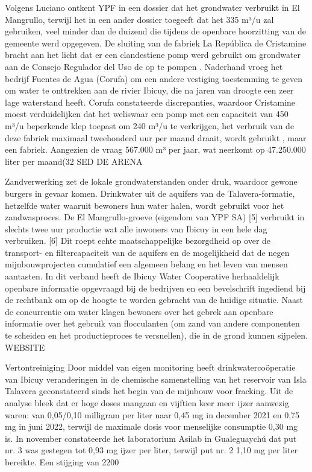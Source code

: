Volgens Luciano ontkent YPF in een dossier dat het grondwater verbruikt in El Mangrullo, terwijl het in een ander dossier toegeeft dat het 335 m³/u zal gebruiken, veel minder dan de duizend die tijdens de openbare hoorzitting van de gemeente werd opgegeven. De sluiting van de fabriek La República de Cristamine bracht aan het licht dat er een clandestiene pomp werd gebruikt om grondwater aan de Consejo Regulador del Uso de op te pompen . Naderhand vroeg het bedrijf Fuentes de Agua (Corufa) om een andere vestiging toestemming te geven om water te onttrekken aan de rivier Ibicuy, die na jaren van droogte een zeer lage waterstand heeft. Corufa constateerde discrepanties, waardoor Cristamine moest verduidelijken dat het weliswaar een pomp met een capaciteit van 450 m³/u beperkende klep toepast om 240 m³/u te verkrijgen, het verbruik van de deze fabriek maximaal tweehonderd uur per maand draait, wordt gebruikt , maar een fabriek. Aangezien de vraag 567.000 m³ per jaar, wat neerkomt op 47.250.000 liter per maand(32 SED DE ARENA

Zandverwerking zet de lokale grondwaterstanden onder druk, waardoor gewone burgers in gevaar komen. Drinkwater uit de aquifers van de Talavera-formatie, hetzelfde water waaruit bewoners hun water halen, wordt gebruikt voor het zandwasproces. De El Mangrullo-groeve (eigendom van YPF SA) [5] verbruikt in slechts twee uur productie wat alle inwoners van Ibicuy in een hele dag verbruiken. [6] Dit roept echte maatschappelijke bezorgdheid op over de transport- en filtercapaciteit van de aquifers en de mogelijkheid dat de negen mijnbouwprojecten cumulatief een algemeen belang en het leven van mensen aantasten. In dit verband heeft de Ibicuy Water Cooperative herhaaldelijk openbare informatie opgevraagd bij de bedrijven en een bevelschrift ingediend bij de rechtbank om op de hoogte te worden gebracht van de huidige situatie. Naast de concurrentie om water klagen bewoners over het gebrek aan openbare informatie over het gebruik van flocculanten (om zand van andere componenten te scheiden en het productieproces te versnellen), die in de grond kunnen sijpelen. WEBSITE

Vertontreiniging
Door middel van eigen monitoring heeft drinkwatercoöperatie van Ibicuy veranderingen in de chemische samenstelling van het reservoir van Isla Talavera geconstateerd sinds het begin van de mijnbouw voor fracking. Uit de analyse bleek dat er hoge doses mangaan en vijftien keer meer ijzer aanwezig waren: van 0,05/0,10 milligram per liter naar 0,45 mg in december 2021 en 0,75 mg in juni 2022, terwijl de maximale dosis voor menselijke consumptie 0,30 mg is. In november constateerde het laboratorium Asilab in Gualeguaychú dat put nr. 3 was gestegen tot 0,93 mg ijzer per liter, terwijl put nr. 2 1,10 mg per liter bereikte. Een stijging van 2200 %

